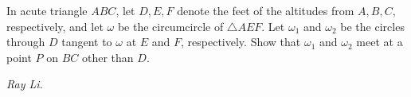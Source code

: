 In acute triangle $ABC$, let $D,E,F$ denote the feet of the altitudes from $A,B,C$, respectively, and let $\omega$ be the circumcircle of $\triangle AEF$. Let $\omega_1$ and $\omega_2$ be the circles through $D$ tangent to $\omega$ at $E$ and $F$, respectively. Show that $\omega_1$ and $\omega_2$ meet at a point $P$ on $BC$ other than $D$.

\textit{Ray Li.}